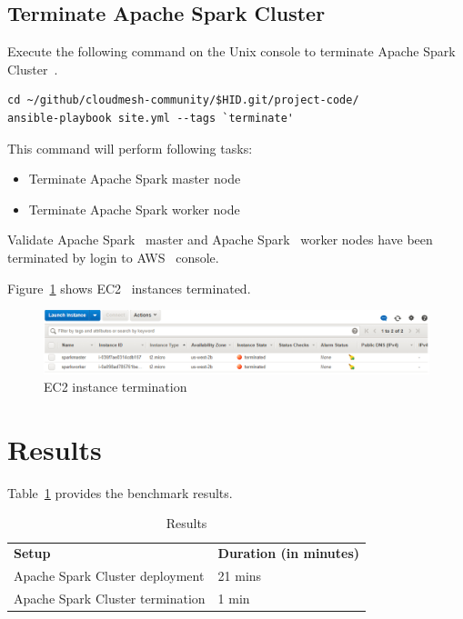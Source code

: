 \subsection{Terminate Apache Spark Cluster}

Execute the following command on the Unix console to terminate Apache
Spark Cluster~\cite{hid-sp18-511-www-spark}.

\begin{verbatim}
cd ~/github/cloudmesh-community/$HID.git/project-code/
ansible-playbook site.yml --tags `terminate'
\end{verbatim}

This command will perform following tasks:

\begin{itemize}
	\item Terminate Apache Spark master node
	\item Terminate Apache Spark worker node
\end{itemize}

Validate Apache Spark~\cite{hid-sp18-511-www-spark} master and Apache
Spark~\cite{hid-sp18-511-www-spark} worker nodes have been terminated
by login to AWS~\cite{hid-sp18-511-www-aws} console.

Figure~\ref{f:ec2-instance-terminate} shows
EC2~\cite{hid-sp18-511-www-ec2} instances terminated.

\begin{figure}[!ht]
	\centering\includegraphics[width=\columnwidth]
        {images/ec2instancesterminate.png} \caption{EC2
	instance termination}\label{f:ec2-instance-terminate}
\end{figure}

\section{Results}

Table~\ref{t:results-table} provides the benchmark results.

\begin{table}[]
	\centering
	\caption{Results}\label{t:results-table}
	\begin{tabular}{ll} 
		\textbf{Setup} & \textbf{Duration (in minutes)} \\ 
		Apache Spark Cluster deployment  & 21 mins \\
		Apache Spark Cluster termination & 1 min \\
	\end{tabular}
\end{table}

